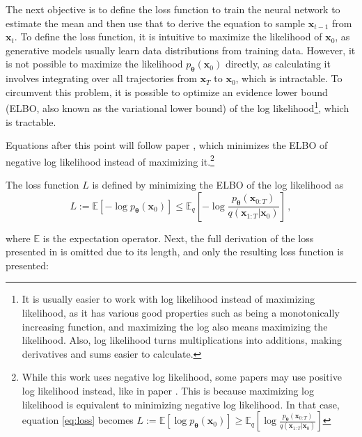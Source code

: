 The next objective is to define the loss function to train the neural network to estimate the mean and then use that to derive the equation to sample $\mathbf{x}_{t-1}$ from $\mathbf{x}_t$. To define the loss function, it is intuitive to maximize the likelihood of $\mathbf{x}_0$, as generative models usually learn data distributions from training data. However, it is not possible to maximize the likelihood $p_{\boldsymbol{\theta}}\left(\mathbf{x}_0\right)$ directly, as calculating it involves integrating over all trajectories from $\mathbf{x}_T$ to $\mathbf{x}_0$, which is intractable. To circumvent this problem, it is possible to optimize an evidence lower bound (ELBO, also known as the variational lower bound) of the log likelihood\footnote{It is usually easier to work with log likelihood instead of maximizing likelihood, as it has various good properties such as being a monotonically increasing function, and maximizing the log also means maximizing the likelihood. Also, log likelihood turns multiplications into additions, making derivatives and sums easier to calculate.}, which is tractable. \cite{strümke2023lecturenotesprobabilisticdiffusion}

Equations after this point will follow paper \cite{ho2020denoisingdiffusionprobabilisticmodels}, which minimizes the ELBO of negative log likelihood instead of maximizing it.\footnote{While this work uses negative log likelihood, some papers may use positive log likelihood instead, like in paper \cite{sohldickstein2015deepunsupervisedlearningusing}. This is because maximizing log likelihood is equivalent to minimizing negative log likelihood. In that case, equation \ref{eq:loss} becomes $L := \mathbb{E}\left[\log p_{\boldsymbol{\theta}}\left(\mathbf{x}_0\right)\right] \geq \mathbb{E}_{q}\left[\log\frac{p_{\boldsymbol{\theta}}\left( \mathbf{x}_{0:T}\right)}{q\left( \mathbf{x}_{1:T} | \mathbf{x}_0\right)} \right]$}

The loss function $L$ is defined by minimizing the ELBO of the log likelihood as
\begin{equation}
L := \mathbb{E}\left[-\log p_{\boldsymbol{\theta}}\left(\mathbf{x}_0\right)\right] \leq \mathbb{E}_{q}\left[-\log\frac{p_{\boldsymbol{\theta}}\left( \mathbf{x}_{0:T}\right)}{q\left( \mathbf{x}_{1:T} | \mathbf{x}_0\right)} \right] \,,
\label{eq:loss}
\end{equation}

where $\mathbb{E}$ is the expectation operator. Next, the full derivation of the loss presented in \cite{ho2020denoisingdiffusionprobabilisticmodels} is omitted due to its length, and only the resulting loss function is presented:

